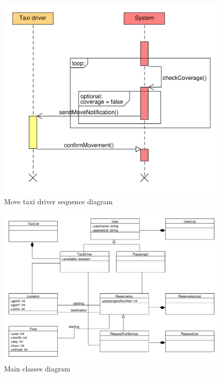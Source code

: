 \begin{figure}
\centering
\includegraphics[width=\textwidth]{tex-images/sequence-move-taxi}
\caption{Move taxi driver sequence diagram}
\end{figure}




\begin{figure}
\centering
\includegraphics[width=\textwidth]{tex-images/class-diagram}
\caption{Main classes diagram}
\end{figure}


